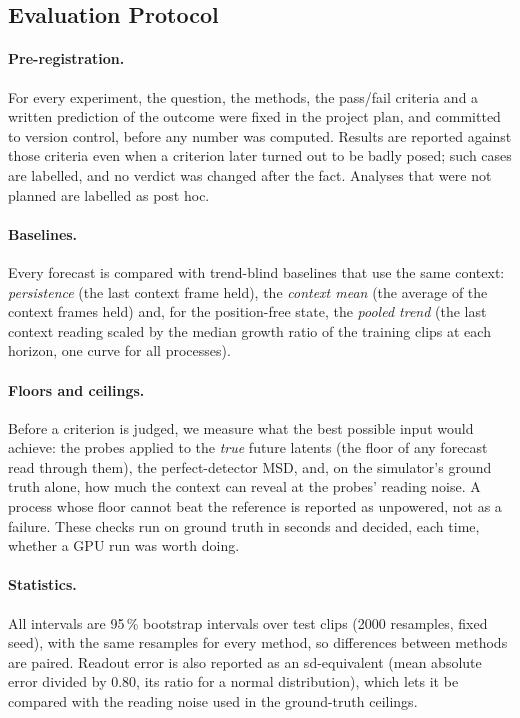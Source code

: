 \subsection{Evaluation Protocol}
\label{sec:protocol}

\paragraph{Pre-registration.} For every experiment, the question, the methods, the
pass/fail criteria and a written prediction of the outcome were fixed in the project
plan, and committed to version control, before any number was computed. Results are
reported against those criteria even when a criterion later turned out to be badly
posed; such cases are labelled, and no verdict was changed after the fact. Analyses that
were not planned are labelled as post hoc.

\paragraph{Baselines.} Every forecast is compared with trend-blind baselines that use
the same context: \emph{persistence} (the last context frame held), the \emph{context
mean} (the average of the context frames held) and, for the position-free state, the
\emph{pooled trend} (the last context reading scaled by the median growth ratio of the
training clips at each horizon, one curve for all processes).

\paragraph{Floors and ceilings.} Before a criterion is judged, we measure what the best
possible input would achieve: the probes applied to the \emph{true} future latents (the
floor of any forecast read through them), the perfect-detector MSD, and, on the
simulator's ground truth alone, how much the context can reveal at the probes' reading
noise. A process whose floor cannot beat the reference is reported as unpowered, not as
a failure. These checks run on ground truth in seconds and decided, each time, whether a
GPU run was worth doing.

\paragraph{Statistics.} All intervals are 95\,\% bootstrap intervals over test clips
(2000 resamples, fixed seed), with the same resamples for every method, so differences
between methods are paired. Readout error is also reported as an sd-equivalent
(mean absolute error divided by 0.80, its ratio for a normal distribution), which lets
it be compared with the reading noise used in the ground-truth ceilings.
